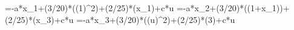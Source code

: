 =-a*x_1+(3/20)*\sin((1)^2)+(2/25)*\cos(x_1)+c*u
=-a*x_2+(3/20)*\sin((1+x_1))+(2/25)*\cos(x_3)+c*u
=-a*x_3+(3/20)*\sin((u)^2)+(2/25)*\cos(3)+c*u
